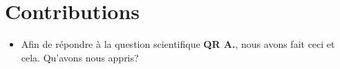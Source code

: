 
\section{Contributions}

\begin{itemize}
\item Afin de répondre à la question scientifique \textbf{QR A.}, nous avons
  fait ceci et cela. Qu'avons nous appris?
\end{itemize}
